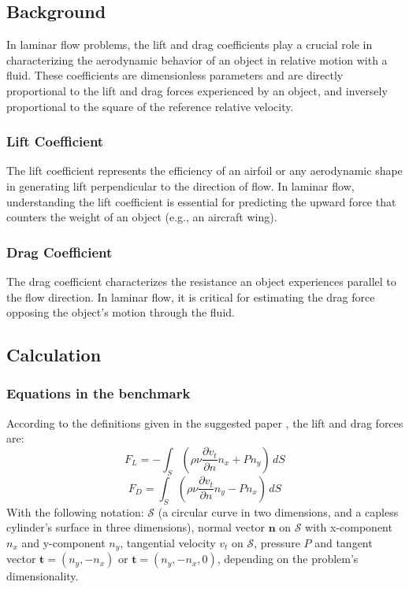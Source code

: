 \subsection{Background}
In laminar flow problems, the lift and drag coefficients play a crucial role in characterizing the aerodynamic behavior of an object in relative motion with a fluid. These coefficients are dimensionless parameters and are directly proportional to the lift and drag forces experienced by an object, and inversely proportional to the square of the reference relative velocity.

\subsubsection{Lift Coefficient}
The lift coefficient represents the efficiency of an airfoil or any aerodynamic shape in generating lift perpendicular to the direction of flow. In laminar flow, understanding the lift coefficient is essential for predicting the upward force that counters the weight of an object (e.g., an aircraft wing).
\subsubsection{Drag Coefficient}
The drag coefficient characterizes the resistance an object experiences parallel to the flow direction. In laminar flow, it is critical for estimating the drag force opposing the object's motion through the fluid.
    
\subsection{Calculation}
\subsubsection{Equations in the benchmark}
According to the definitions given in the suggested paper \cite{Cylinder}, the lift and drag forces are:
\begin{equation}
F_L = - \int_S (\rho \nu \frac{\partial v_t}{\partial n}n_x + P n_y) \, dS
\end{equation}
\begin{equation}
F_D = \int_S (\rho \nu \frac{\partial v_t}{\partial n}n_y - P n_x) \, dS
\end{equation}
With the following notation: $\mathcal{S}$ (a circular curve in two dimensions, and a capless cylinder's surface in three dimensions), normal vector $\mathbf{n}$ on $\mathcal{S}$ with x-component $n_x$ and y-component $n_y$, tangential velocity $v_t$ on $\mathcal{S}$, pressure $P$ and tangent vector $\mathbf{t} = (n_y, -n_x)$ or $\mathbf{t} = (n_y, -n_x, 0)$, depending on the problem's dimensionality.

